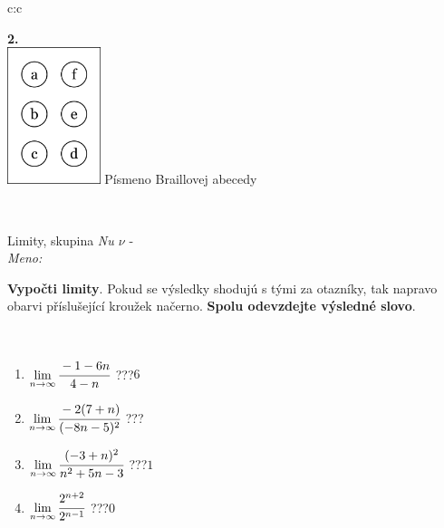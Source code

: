 \documentclass[10pt]{report}
\begin{document}
\begin{tabular}{c:c}
\begin{minipage}[c][104.5mm][t]{0.5\linewidth}
\begin{center}
\begin{minipage}{0.20\linewidth}
\begin{center}
{\Huge\bfseries 2.} \\[2mm]
\includegraphics[height=40mm]{../images/braille.png}
{\small Písmeno Braillovej abecedy}
\end{center}
\end{minipage}
\end{center}
\end{minipage}
\\ \hdashline
\begin{minipage}[c][104.5mm][t]{0.5\linewidth}
\begin{center}
\vspace{7mm}
{\huge Limity, skupina \textit{Nu $\nu$} -}\\[5mm]
\textit{Meno:}\phantom{xxxxxxxxxxxxxxxxxxxxxxxxxxxxxxxxxxxxxxxxxxxxxxxxxxxxxxxxxxxxxxxxx}\\[5mm]
\begin{minipage}{0.95\linewidth}
\begin{center}
\textbf{Vypočti limity}. Pokud se výsledky shodujú s tými za otazníky, tak napravo\\obarvi příslušející kroužek načerno. \textbf{Spolu odevzdejte výsledné slovo}.
\end{center}
\end{minipage}
\\[1mm]
\begin{minipage}{0.79\linewidth}
\begin{center}
\begin{varwidth}{\linewidth}
\begin{enumerate}
\normalsize
\item $\lim\limits_{n\to\infty}\cfrac{-1-6n}{4-n}$\quad \dotfill\; ???\;\dotfill \quad $6$
\item $\lim\limits_{n\to\infty}\cfrac{-2(7+n)}{(-8n-5)^2}$\quad \dotfill\; ???\;\dotfill {}
\item $\lim\limits_{n\to\infty}\cfrac{(-3+n)^2}{n^2+5n-3}$\quad \dotfill\; ???\;\dotfill \quad $1$
\item $\lim\limits_{n\to\infty}\cfrac{2^{n+2}}{2^{n-1}}$\quad \dotfill\; ???\;\dotfill \quad $0$

\end{enumerate}
\end{varwidth}
\end{center}
\end{minipage}
\end{center}
\end{minipage}
\end{tabular}
\end{document}
